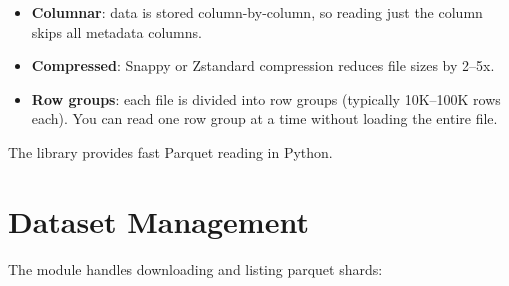 \begin{itemize}
  \item \textbf{Columnar}: data is stored column-by-column, so reading just the  column skips all metadata columns.
  \item \textbf{Compressed}: Snappy or Zstandard compression reduces file sizes by 2--5x.
  \item \textbf{Row groups}: each file is divided into row groups (typically 10K--100K rows each).  You can read one row group at a time without loading the entire file.
\end{itemize}

The  library provides fast Parquet reading in Python.


\section{Dataset Management}

The  module handles downloading and listing parquet shards:

